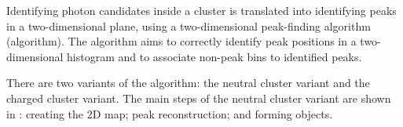 




Identifying photon candidates inside a cluster is translated into identifying peaks in a two-dimensional plane, using a two-dimensional peak-finding algorithm (\peakFinding algorithm). The \peakFinding algorithm aims to correctly identify peak positions in a two-dimensional histogram and to associate non-peak bins to identified peaks.


There are two variants of the \peakFinding algorithm: the neutral cluster variant and the charged cluster variant. The main steps of the neutral cluster variant are shown in : creating the 2D map; peak reconstruction; and forming \ShowerPeak objects.



